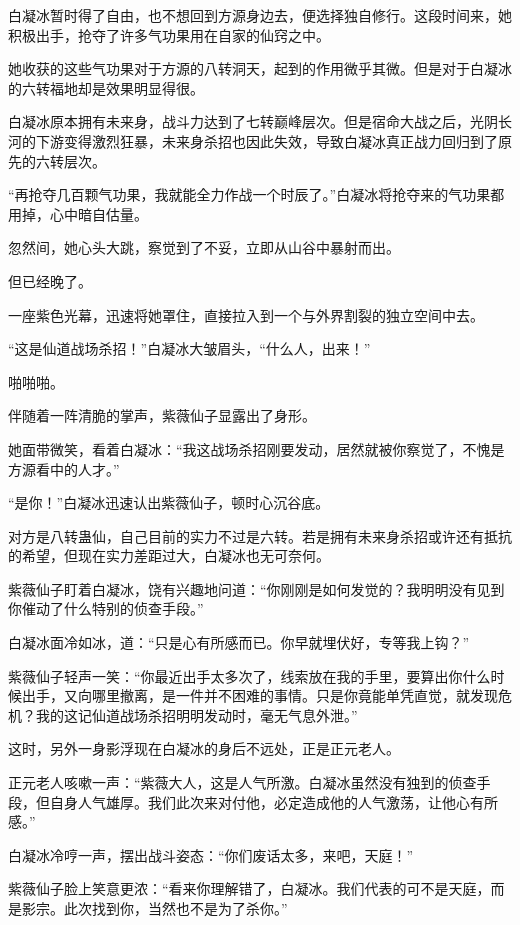 \begin{this_body}
白凝冰暂时得了自由，也不想回到方源身边去，便选择独自修行。这段时间来，她积极出手，抢夺了许多气功果用在自家的仙窍之中。

她收获的这些气功果对于方源的八转洞天，起到的作用微乎其微。但是对于白凝冰的六转福地却是效果明显得很。

白凝冰原本拥有未来身，战斗力达到了七转巅峰层次。但是宿命大战之后，光阴长河的下游变得激烈狂暴，未来身杀招也因此失效，导致白凝冰真正战力回归到了原先的六转层次。

“再抢夺几百颗气功果，我就能全力作战一个时辰了。”白凝冰将抢夺来的气功果都用掉，心中暗自估量。

忽然间，她心头大跳，察觉到了不妥，立即从山谷中暴射而出。

但已经晚了。

一座紫色光幕，迅速将她罩住，直接拉入到一个与外界割裂的独立空间中去。

“这是仙道战场杀招！”白凝冰大皱眉头，“什么人，出来！”

啪啪啪。

伴随着一阵清脆的掌声，紫薇仙子显露出了身形。

她面带微笑，看着白凝冰：“我这战场杀招刚要发动，居然就被你察觉了，不愧是方源看中的人才。”

“是你！”白凝冰迅速认出紫薇仙子，顿时心沉谷底。

对方是八转蛊仙，自己目前的实力不过是六转。若是拥有未来身杀招或许还有抵抗的希望，但现在实力差距过大，白凝冰也无可奈何。

紫薇仙子盯着白凝冰，饶有兴趣地问道：“你刚刚是如何发觉的？我明明没有见到你催动了什么特别的侦查手段。”

白凝冰面冷如冰，道：“只是心有所感而已。你早就埋伏好，专等我上钩？”

紫薇仙子轻声一笑：“你最近出手太多次了，线索放在我的手里，要算出你什么时候出手，又向哪里撤离，是一件并不困难的事情。只是你竟能单凭直觉，就发现危机？我的这记仙道战场杀招明明发动时，毫无气息外泄。”

这时，另外一身影浮现在白凝冰的身后不远处，正是正元老人。

正元老人咳嗽一声：“紫薇大人，这是人气所激。白凝冰虽然没有独到的侦查手段，但自身人气雄厚。我们此次来对付他，必定造成他的人气激荡，让他心有所感。”

白凝冰冷哼一声，摆出战斗姿态：“你们废话太多，来吧，天庭！”

紫薇仙子脸上笑意更浓：“看来你理解错了，白凝冰。我们代表的可不是天庭，而是影宗。此次找到你，当然也不是为了杀你。”


\end{this_body}
